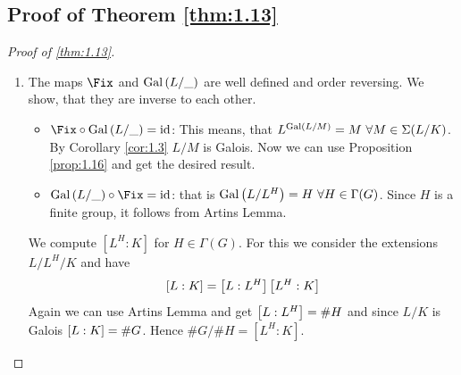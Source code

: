 \documentclass[twoside = false,	%
		headsepline,		%
		parskip = true,
		]{scrbook}						%
\begin{document}
        \subsection{Proof of Theorem \ref{thm:1.13}}
        \begin{proof}[Proof of \ref{thm:1.13}]
        \begin{enumerate}
            \item [(1)]
            The maps $\Fix$ and $\mathrm{Gal}\left( L/\_\right)$ are well defined and order reversing. We show, that they are inverse to each other.
            \begin{itemize}
                \item $\Fix\circ\Gal{L/\_}=\id$:
                This means, that $L^{\mathrm{Gal}\left( L/M\right)}=M\ \forall M\in\Sigma(L/K)$. By Corollary \ref{cor:1.3} $L/M$ is Galois. Now we can use Proposition \ref{prop:1.16} and get the desired result.
                \item $\Gal{L/\_}\circ\Fix=\id$: that is $\mathrm{Gal}\left( L/L^H\right)=H\ \forall H\in\Gamma(G)$. Since $H$ is a finite group, it follows from Artins Lemma.
            \end{itemize}
            We compute $[L^H:K]$ for $H\in\Gamma(G)$. For this we consider the extensions $L/L^H/K$ and have $$\left[ L:K\right]=\left[ L:L^H\right]\left[ L^H:K\right]$$
            Again we can use Artins Lemma and get $\left[ L:L^H\right]=\#H$ and since $L/K$ is Galois $\left[ L:K\right]=\#G$. Hence $\#G/\#H = [L^H:K]$.
            

\end{enumerate}
\end{proof}
\end{document}
